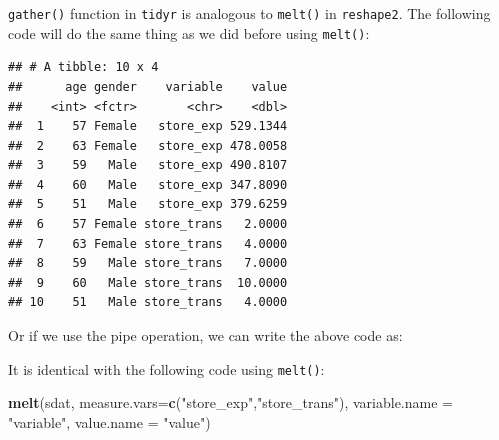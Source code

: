 \documentclass[]{book}
\newenvironment{Shaded}{\begin{snugshade}}{\end{snugshade}}
\newcommand{\KeywordTok}[1]{\textcolor[rgb]{0.13,0.29,0.53}{\textbf{{#1}}}}
\newcommand{\DataTypeTok}[1]{\textcolor[rgb]{0.13,0.29,0.53}{{#1}}}
\newcommand{\StringTok}[1]{\textcolor[rgb]{0.31,0.60,0.02}{{#1}}}
\newcommand{\NormalTok}[1]{{#1}}
\theoremstyle{definition}
\theoremstyle{definition}
\theoremstyle{remark}
\begin{document}
\texttt{gather()} function in \texttt{tidyr} is analogous to
\texttt{melt()} in \texttt{reshape2}. The following code will do the
same thing as we did before using \texttt{melt()}:

\begin{Shaded}
\end{Shaded}

\begin{verbatim}
## # A tibble: 10 x 4
##      age gender    variable    value
##    <int> <fctr>       <chr>    <dbl>
##  1    57 Female   store_exp 529.1344
##  2    63 Female   store_exp 478.0058
##  3    59   Male   store_exp 490.8107
##  4    60   Male   store_exp 347.8090
##  5    51   Male   store_exp 379.6259
##  6    57 Female store_trans   2.0000
##  7    63 Female store_trans   4.0000
##  8    59   Male store_trans   7.0000
##  9    60   Male store_trans  10.0000
## 10    51   Male store_trans   4.0000
\end{verbatim}

Or if we use the pipe operation, we can write the above code as:

\begin{Shaded}
\end{Shaded}

It is identical with the following code using \texttt{melt()}:

\begin{Shaded}
\begin{Highlighting}[]
\KeywordTok{melt}\NormalTok{(sdat, }\DataTypeTok{measure.vars=}\KeywordTok{c}\NormalTok{(}\StringTok{"store_exp"}\NormalTok{,}\StringTok{"store_trans"}\NormalTok{),}
            \DataTypeTok{variable.name =} \StringTok{"variable"}\NormalTok{,}
              \DataTypeTok{value.name =} \StringTok{"value"}\NormalTok{)}
\end{Highlighting}
\end{Shaded}
\end{document}
